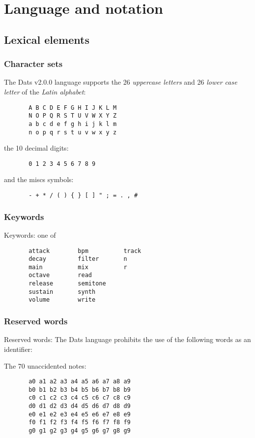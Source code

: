 \section{Language and notation}
\subsection{Lexical elements}
\subsubsection{Character sets}

The Dats v2.0.0 language supports the 26 \textit{uppercase letters} and 26
\textit{lower case letter} of the \textit{Latin alphabet}:

\begin{verbatim}
       A B C D E F G H I J K L M
       N O P Q R S T U V W X Y Z
       a b c d e f g h i j k l m
       n o p q r s t u v w x y z
\end{verbatim}

the 10 {decimal digits}:
\begin{verbatim}
       0 1 2 3 4 5 6 7 8 9
\end{verbatim}

and the miscs symbols:
\begin{verbatim}
       - + * / ( ) { } [ ] " ; = . , #
\end{verbatim}

\subsubsection{Keywords}

\np Keywords: one of

\begin{verbatim}
       attack        bpm          track
       decay         filter       n
       main          mix          r
       octave        read
       release       semitone
       sustain       synth
       volume        write
\end{verbatim}

\subsubsection{Reserved words}

\np Reserved words: The Dats language prohibits the use of the
following words as an identifier:

\np The 70 unaccidented notes:

\begin{verbatim}
       a0 a1 a2 a3 a4 a5 a6 a7 a8 a9
       b0 b1 b2 b3 b4 b5 b6 b7 b8 b9
       c0 c1 c2 c3 c4 c5 c6 c7 c8 c9
       d0 d1 d2 d3 d4 d5 d6 d7 d8 d9
       e0 e1 e2 e3 e4 e5 e6 e7 e8 e9
       f0 f1 f2 f3 f4 f5 f6 f7 f8 f9
       g0 g1 g2 g3 g4 g5 g6 g7 g8 g9
\end{verbatim}

